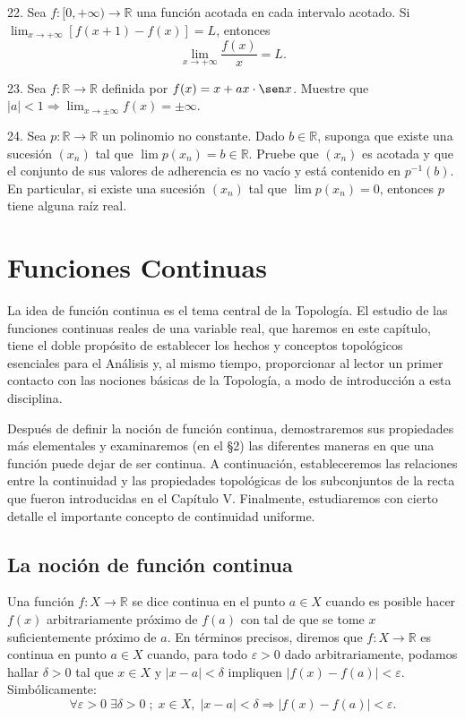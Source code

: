 \documentclass[12pt,oneside]{book}
\begin{document}
22. Sea \( f: [0, +\infty) \to \mathbb{R} \) una función acotada en cada intervalo acotado. Si \( \lim_{x \to +\infty} [f(x + 1) - f(x)] = L \), entonces
\[
\lim_{x \to +\infty} \frac{f(x)}{x} = L.
\]

23. Sea \( f: \mathbb{R} \to \mathbb{R} \) definida por \( f(x) = x + a x \cdot \sen x \). Muestre que \( |a| < 1 \Rightarrow \lim_{x \to \pm\infty} f(x) = \pm\infty \).

24. Sea \( p: \mathbb{R} \to \mathbb{R} \) un polinomio no constante. Dado \( b \in \mathbb{R} \), suponga que existe una sucesión \( (x_n) \) tal que \( \lim p(x_n) = b \in \mathbb{R} \). Pruebe que \( (x_n) \) es acotada y que el conjunto de sus valores de adherencia es no vacío y está contenido en \( p^{-1}(b) \). En particular, si existe una sucesión \( (x_n) \) tal que \( \lim p(x_n) = 0 \), entonces \( p \) tiene alguna raíz real.

\newpage

\chapter{Funciones Continuas}

La idea de función continua es el tema central de la Topología. El estudio de las funciones continuas reales de una variable real, que haremos en este capítulo, tiene el doble propósito de establecer los hechos y conceptos topológicos esenciales para el Análisis y, al mismo tiempo, proporcionar al lector un primer contacto con las nociones básicas de la Topología, a modo de introducción a esta disciplina.

Después de definir la noción de función continua, demostraremos sus propiedades más elementales y examinaremos (en el §2) las diferentes maneras en que una función puede dejar de ser continua. A continuación, estableceremos las relaciones entre la continuidad y las propiedades topológicas de los subconjuntos de la recta que fueron introducidas en el Capítulo V. Finalmente, estudiaremos con cierto detalle el importante concepto de continuidad uniforme.

\section{La noción de función continua}

Una función \(f: X \to \mathbb{R}\) se dice continua en el punto \(a \in X\) cuando es posible hacer \(f(x)\) arbitrariamente próximo de \(f(a)\) con tal de que se tome \(x\) suficientemente próximo de \(a\). En términos precisos, diremos que \(f: X \to \mathbb{R}\) es continua en punto \(a \in X\) cuando, para todo \(\varepsilon > 0\) dado arbitrariamente, podamos hallar \(\delta > 0\) tal que \(x \in X\) y \(|x - a| < \delta\) impliquen \(|f(x) - f(a)| < \varepsilon\). Simbólicamente:
\[
\forall \varepsilon > 0 \; \exists \delta > 0 \; ; \; x \in X, \; |x - a| < \delta \Rightarrow |f(x) - f(a)| < \varepsilon.
\]
\end{document}
